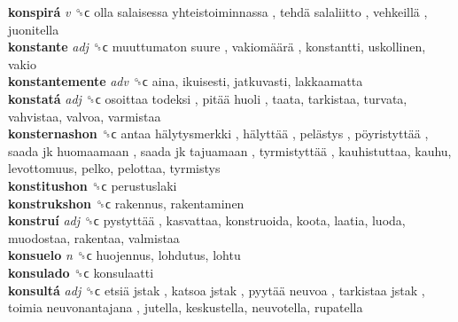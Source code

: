 \textbf{konspirá} \emph{v}  ␝ϲ   olla salaisessa yhteistoiminnassa ,  tehdä salaliitto ,  vehkeillä , juonitella  \\
\textbf{konstante} \emph{adj}  ␝ϲ   muuttumaton suure ,  vakiomäärä , konstantti, uskollinen, vakio  \\
\textbf{konstantemente} \emph{adv}  ␝ϲ  aina, ikuisesti, jatkuvasti, lakkaamatta  \\
\textbf{konstatá} \emph{adj}  ␝ϲ   osoittaa todeksi ,  pitää huoli , taata, tarkistaa, turvata, vahvistaa, valvoa, varmistaa  \\
\textbf{konsternashon} ␝ϲ   antaa hälytysmerkki ,  hälyttää ,  pelästys ,  pöyristyttää ,  saada jk huomaamaan ,  saada jk tajuamaan ,  tyrmistyttää , kauhistuttaa, kauhu, levottomuus, pelko, pelottaa, tyrmistys  \\
\textbf{konstitushon} ␝ϲ  perustuslaki  \\
\textbf{konstrukshon} ␝ϲ  rakennus, rakentaminen  \\
\textbf{konstruí} \emph{adj}  ␝ϲ   pystyttää , kasvattaa, konstruoida, koota, laatia, luoda, muodostaa, rakentaa, valmistaa  \\
\textbf{konsuelo} \emph{n}  ␝ϲ  huojennus, lohdutus, lohtu  \\
\textbf{konsulado} ␝ϲ  konsulaatti  \\
\textbf{konsultá} \emph{adj}  ␝ϲ   etsiä jstak ,  katsoa jstak ,  pyytää neuvoa ,  tarkistaa jstak ,  toimia neuvonantajana , jutella, keskustella, neuvotella, rupatella  \\
